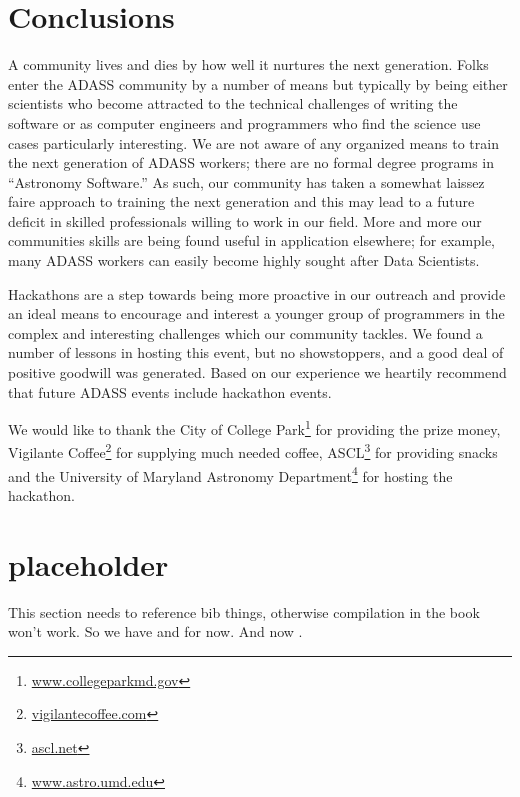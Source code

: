 \documentclass[11pt,twoside]{article}
\begin{document}
\section*{Conclusions}

A community lives and dies by how well it nurtures the next generation. Folks enter the ADASS community by a number of means but typically by being either scientists who become attracted to the technical challenges of writing the software or as computer engineers and programmers who find the science use cases particularly interesting. We are not aware of any organized means to train the next generation of ADASS workers; there are no formal degree programs in “Astronomy Software.” As such, our community has taken a somewhat laissez faire approach to training the next generation and this may lead to a future deficit in skilled professionals willing to work in our field.  More and more our communities skills are being found useful in application elsewhere; for example, many ADASS workers can easily become highly sought after Data Scientists.

Hackathons are a step towards being more proactive in our outreach and provide an ideal means to encourage and interest a younger group of programmers in the complex and interesting challenges which our community tackles. We found a number of lessons in hosting this event, but no showstoppers, and a good deal of positive goodwill was generated. Based on our experience we heartily recommend that future ADASS events include hackathon events.

\acknowledgements We would like to thank the City of College Park\footnote{\url{www.collegeparkmd.gov}} for providing the prize money, Vigilante Coffee\footnote{\url{vigilantecoffee.com}} for supplying much needed coffee, ASCL\footnote{\url{ascl.net}} for providing snacks and the University of Maryland Astronomy Department\footnote{\url{www.astro.umd.edu}} for hosting the hackathon.

\section{placeholder}

This section needs to reference bib things, otherwise compilation in the book won't work.
So we have \citet{2018PNAS..115.8872H} and \citet{I8-1_adassxxviii} for now. And now
\citet{BHHK18}.




%
\end{document}
